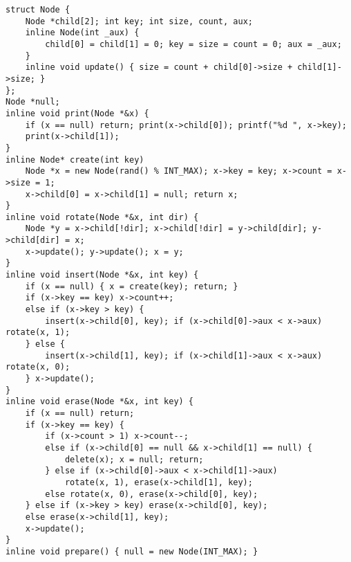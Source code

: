 \begin{lstlisting}
struct Node {
	Node *child[2]; int key; int size, count, aux;
	inline Node(int _aux) {
		child[0] = child[1] = 0; key = size = count = 0; aux = _aux;
	}
	inline void update() { size = count + child[0]->size + child[1]->size; }
};
Node *null;
inline void print(Node *&x) {
	if (x == null) return; print(x->child[0]); printf("%d ", x->key);
	print(x->child[1]);
}
inline Node* create(int key)
	Node *x = new Node(rand() % INT_MAX); x->key = key; x->count = x->size = 1;
	x->child[0] = x->child[1] = null; return x;
}
inline void rotate(Node *&x, int dir) {
	Node *y = x->child[!dir]; x->child[!dir] = y->child[dir]; y->child[dir] = x;
	x->update(); y->update(); x = y;
}
inline void insert(Node *&x, int key) {
	if (x == null) { x = create(key); return; }
	if (x->key == key) x->count++;
	else if (x->key > key) {
		insert(x->child[0], key); if (x->child[0]->aux < x->aux) rotate(x, 1);
	} else {
		insert(x->child[1], key); if (x->child[1]->aux < x->aux) rotate(x, 0);
	} x->update();
}
inline void erase(Node *&x, int key) {
	if (x == null) return;
	if (x->key == key) {
		if (x->count > 1) x->count--;
		else if (x->child[0] == null && x->child[1] == null) {
			delete(x); x = null; return;
		} else if (x->child[0]->aux < x->child[1]->aux)
			rotate(x, 1), erase(x->child[1], key);
		else rotate(x, 0), erase(x->child[0], key);
	} else if (x->key > key) erase(x->child[0], key);
	else erase(x->child[1], key);
	x->update();
}
inline void prepare() { null = new Node(INT_MAX); }
\end{lstlisting}